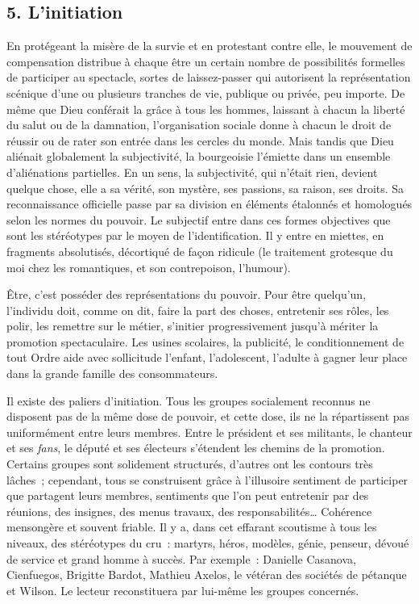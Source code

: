 \documentclass[french,twoside]{book} %
\begin{document}
\subsection[{5. L’initiation}]{\textsc{5.} L’initiation}
\noindent En protégeant la misère de la survie et en protestant contre elle, le mouvement de compensation distribue à chaque être un certain nombre de possibilités formelles de participer au spectacle, sortes de laissez-passer qui autorisent la représentation scénique d’une ou plusieurs tranches de vie, publique ou privée, peu importe. De même que Dieu conférait la grâce à tous les hommes, laissant à chacun la liberté du salut ou de la damnation, l’organisation sociale donne à chacun le droit de réussir ou de rater son entrée dans les cercles du monde. Mais tandis que Dieu aliénait globalement la subjectivité, la bourgeoisie l’émiette dans un ensemble d’aliénations partielles. En un sens, la subjectivité, qui n’était rien, devient quelque chose, elle a sa vérité, son mystère, ses passions, sa raison, ses droits. Sa reconnaissance officielle passe par sa division en éléments étalonnés et homologués selon les normes du pouvoir. Le subjectif entre dans ces formes objectives que sont les stéréotypes par le moyen de l’identification. Il y entre en miettes, en fragments absolutisés, décortiqué de façon ridicule (le traitement grotesque du moi chez les romantiques, et son contrepoison, l’humour).\par
Être, c’est posséder des représentations du pouvoir. Pour être quelqu’un, l’individu doit, comme on dit, faire la part des choses, entretenir ses rôles, les polir, les remettre sur le métier, s’initier progressivement jusqu’à mériter la promotion spectaculaire. Les usines scolaires, la publicité, le conditionnement de tout Ordre aide avec sollicitude l’enfant, l’adolescent, l’adulte à gagner leur place dans la grande famille des consommateurs.\par
Il existe des paliers d’initiation. Tous les groupes socialement reconnus ne disposent pas de la même dose de pouvoir, et cette dose, ils ne la répartissent pas uniformément entre leurs membres. Entre le président et ses militants, le chanteur et ses \emph{fans}, le député et ses électeurs s’étendent les chemins de la promotion. Certains groupes sont solidement structurés, d’autres ont les contours très lâches ; cependant, tous se construisent grâce à l’illusoire sentiment de participer que partagent leurs membres, sentiments que l’on peut entretenir par des réunions, des insignes, des menus travaux, des responsabilités… Cohérence mensongère et souvent friable. Il y a, dans cet effarant scoutisme à tous les niveaux, des stéréotypes du cru : martyrs, héros, modèles, génie, penseur, dévoué de service et grand homme à succès. Par exemple : Danielle Casanova, Cienfuegos, Brigitte Bardot, Mathieu Axelos, le vétéran des sociétés de pétanque et Wilson. Le lecteur reconstituera par lui-même les groupes concernés.\par
\end{document}
